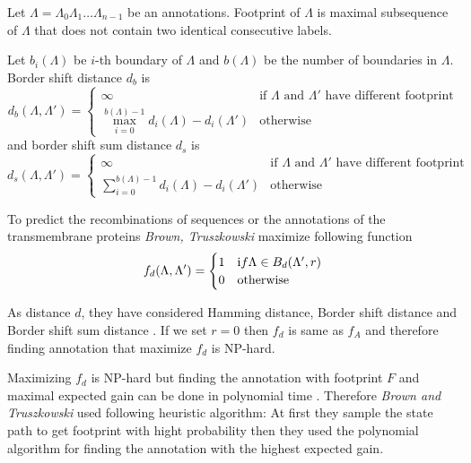 \begin{definition}
Let $\Lambda=\Lambda_0\Lambda_1\dots\Lambda_{n-1}$ be an annotations. Footprint
of $\Lambda$ is maximal subsequence of $\Lambda$ that does not contain two
identical 
consecutive labels.
\end{definition}

\begin{definition}
Let $b_i(\Lambda)$ be $i$-th boundary of $\Lambda$ and $b(\Lambda)$ be the
number of boundaries in $\Lambda$.
Border shift distance $d_{b}$ is 
\begin{equation*}
d_{b}(\Lambda,\Lambda') = \begin{cases}
\infty & \text{if $\Lambda$ and $\Lambda'$ have different footprint}\\
\max_{i=0}^{b(\Lambda)-1} d_i(\Lambda)-d_i(\Lambda') & \text{otherwise}
\end{cases}
\end{equation*}
and border shift sum distance $d_s$ is 
\begin{equation*}
d_{s}(\Lambda,\Lambda') = \begin{cases}
\infty & \text{if $\Lambda$ and $\Lambda'$ have different footprint}\\
\sum_{i=0}^{b(\Lambda)-1} d_i(\Lambda)-d_i(\Lambda') & \text{otherwise}
\end{cases}
\end{equation*}

\end{definition}

To predict the recombinations of sequences or the annotations of the
transmembrane proteins {\it Brown,
Truszkowski} maximize following function
\begin{equation*}
f_d(\Lambda,\Lambda') = 
\begin{cases}
1 & {\text if }\Lambda\in B_d(\Lambda',r)\\
0 & \text{otherwise}
\end{cases}
\end{equation*}

As distance $d$, they have considered Hamming distance, Border shift distance
and Border shift sum distance \cite{Brown2010}.  If we set $r=0$ then $f_d$ is
same as $f_A$ and therefore finding annotation that maximize $f_d$ is NP-hard.

Maximizing $f_d$ is NP-hard but finding the  annotation with footprint $F$ and
maximal expected gain can be done in polynomial time \cite{Brown2010}. Therefore
{\it Brown and Truszkowski} used following heuristic algorithm: At first they
sample the state path to get footprint with hight probability then they used the
polynomial algorithm for finding the annotation with the highest expected gain.


